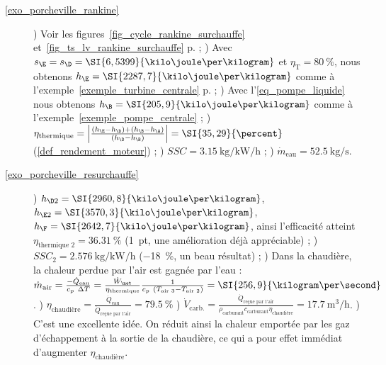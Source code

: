 \exercisesolutionpage
\titreresultats
	
	\begin{description}
		\item [\ref{exo_porcheville_rankine}]
						) Voir les figures~\ref{fig_cycle_rankine_surchauffe} et~\ref{fig_ts_lv_rankine_surchauffe} p.\pageref{fig_ts_lv_rankine_surchauffe} ;
						) Avec $s_\E = s_\D = \SI{6,5399}{\kilo\joule\per\kilogram}$ et $\eta_\text{T} = \SI{80}{\percent}$, nous obtenons $h_\E = \SI{2287,7}{\kilo\joule\per\kilogram} $ comme à l’exemple~\ref{exemple_turbine_centrale} p.\pageref{exemple_turbine_centrale} ;
						) Avec l’\cref{eq_pompe_liquide} nous obtenons $h_\B = \SI{205,9}{\kilo\joule\per\kilogram}$ comme à l’exemple~\ref{exemple_pompe_centrale} ;
						) $\eta_\text{thermique} = \left|\frac{(h_\E - h_\D) + (h_\B - h_\A)}{(h_\D - h_\B)}\right| = \SI{35,29}{\percent}$ (\ref{def_rendement_moteur}) ;
						) $SSC = \SI[per-mode = symbol]{3,15}{\kilogram\per\kilo\watt\per\hour}$ ;
						) $\dot{m}_\text{eau} = \SI{52,5}{\kilogram\per\second}$.
		\item [\ref{exo_porcheville_resurchauffe}]
						) $h_{\D2} = \SI{2960,8}{\kilo\joule\per\kilogram}$, $h_{\E2} = \SI{3570,3}{\kilo\joule\per\kilogram}$, $h_\F = \SI{2642,7}{\kilo\joule\per\kilogram}$, ainsi l’efficacité atteint $\eta_\text{thermique 2} = \SI{36,31}{\percent}$ (\SI{+1}{pt}, une amélioration déjà appréciable) ;
						) $SSC_2 = \SI[per-mode = symbol]{2,576}{\kilogram\per\kilo\watt\per\hour}$ (\SI{-18}{\percent}, un beau résultat) ;
						) Dans la chaudière, la chaleur perdue par l’air est gagnée par l’eau : $\dot m_\text{air} = \frac{-\dot Q_\text{eau}}{c_p \ \Delta T} = \frac{\dot W_\net}{\eta_\text{thermique}} \frac{1}{c_p \ (T_\text{air 3} - T_\text{air 2})}	 = \SI{256,9}{\kilogram\per\second}$.
						) $\eta_\text{chaudière} = \frac{\dot Q_\text{eau}}{\dot Q_\text{reçue par l’air}} = \SI{79,5}{\percent}$
						) $\dot{V}_\text{carb.} = \frac{\dot Q_\text{reçue par l’air}}{\rho_\text{carburant} c_\text{carburant} \eta_\text{chaudière}} = \SI{17,7}{\metre\cubed\per\hour}$.
						) C’est une excellente idée. On réduit ainsi la chaleur emportée par les gaz d’échappement à la sortie de la chaudière, ce qui a pour effet immédiat d’augmenter $\eta_\text{chaudière}$.
						

\end{description}
